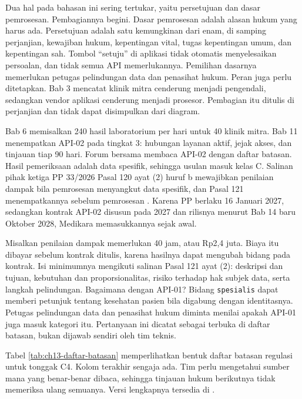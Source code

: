 Dua hal pada bahasan ini sering tertukar, yaitu persetujuan dan dasar pemrosesan. Pembagiannya begini. Dasar pemrosesan adalah alasan hukum yang harus ada. Persetujuan adalah satu kemungkinan dari enam, di samping perjanjian, kewajiban hukum, kepentingan vital, tugas kepentingan umum, dan kepentingan sah. Tombol ``setuju''
di aplikasi tidak otomatis menyelesaikan persoalan, dan tidak semua API memerlukannya. Pemilihan dasarnya memerlukan petugas pelindungan data dan penasihat hukum. Peran juga perlu ditetapkan. Bab 3 mencatat klinik mitra cenderung menjadi pengendali, sedangkan vendor aplikasi cenderung menjadi prosesor. Pembagian itu ditulis di perjanjian dan tidak dapat
disimpulkan dari diagram.

\begin{kasus}[title={Kasus Medikara Health: Batasan pada API-02 Hasil Pemeriksaan}]
Bab 6 memisalkan 240 hasil laboratorium per hari untuk 40 klinik mitra. Bab 11 menempatkan API-02 pada tingkat 3: hubungan layanan aktif, jejak akses, dan tinjauan tiap 90 hari. Forum bersama membaca API-02 dengan daftar batasan. Hasil pemeriksaan adalah data spesifik, sehingga usulan masuk kelas C. Salinan pihak ketiga PP 33/2026 Pasal 120 ayat (2) huruf b mewajibkan
penilaian dampak bila pemrosesan menyangkut data spesifik, dan Pasal 121 menempatkannya sebelum pemrosesan \cite{c13-pp33-2026}. Karena PP berlaku 16 Januari 2027, sedangkan kontrak API-02 disusun pada 2027 dan rilisnya menurut Bab 14 baru Oktober 2028, Medikara memasukkannya sejak awal.

Misalkan penilaian dampak memerlukan 40 jam, atau Rp2,4 juta. Biaya itu dibayar sebelum kontrak ditulis, karena hasilnya dapat mengubah bidang pada kontrak. Isi minimumnya mengikuti salinan Pasal 121 ayat (2): deskripsi dan tujuan, kebutuhan dan proporsionalitas, risiko terhadap hak subjek data, serta langkah pelindungan. Bagaimana dengan API-01? Bidang \texttt{spesialis} dapat
memberi petunjuk tentang kesehatan pasien bila digabung dengan identitasnya. Petugas pelindungan data dan penasihat hukum diminta menilai apakah API-01 juga masuk kategori itu. Pertanyaan ini dicatat sebagai terbuka di daftar batasan, bukan dijawab sendiri oleh tim teknis.
\end{kasus}

Tabel \ref{tab:ch13-daftar-batasan} memperlihatkan bentuk daftar batasan regulasi untuk tonggak C4. Kolom terakhir sengaja ada. Tim perlu mengetahui sumber mana yang benar-benar dibaca, sehingga tinjauan hukum berikutnya tidak memeriksa ulang semuanya. Versi lengkapnya tersedia di .

